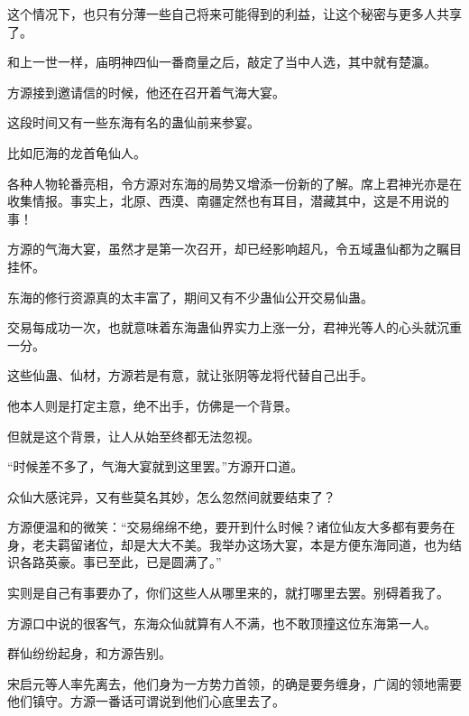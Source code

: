 \begin{this_body}
这个情况下，也只有分薄一些自己将来可能得到的利益，让这个秘密与更多人共享了。

和上一世一样，庙明神四仙一番商量之后，敲定了当中人选，其中就有楚瀛。

方源接到邀请信的时候，他还在召开着气海大宴。

这段时间又有一些东海有名的蛊仙前来参宴。

比如厄海的龙首龟仙人。

各种人物轮番亮相，令方源对东海的局势又增添一份新的了解。席上君神光亦是在收集情报。事实上，北原、西漠、南疆定然也有耳目，潜藏其中，这是不用说的事！

方源的气海大宴，虽然才是第一次召开，却已经影响超凡，令五域蛊仙都为之瞩目挂怀。

东海的修行资源真的太丰富了，期间又有不少蛊仙公开交易仙蛊。

交易每成功一次，也就意味着东海蛊仙界实力上涨一分，君神光等人的心头就沉重一分。

这些仙蛊、仙材，方源若是有意，就让张阴等龙将代替自己出手。

他本人则是打定主意，绝不出手，仿佛是一个背景。

但就是这个背景，让人从始至终都无法忽视。

“时候差不多了，气海大宴就到这里罢。”方源开口道。

众仙大感诧异，又有些莫名其妙，怎么忽然间就要结束了？

方源便温和的微笑：“交易绵绵不绝，要开到什么时候？诸位仙友大多都有要务在身，老夫羁留诸位，却是大大不美。我举办这场大宴，本是方便东海同道，也为结识各路英豪。事已至此，已是圆满了。”

实则是自己有事要办了，你们这些人从哪里来的，就打哪里去罢。别碍着我了。

方源口中说的很客气，东海众仙就算有人不满，也不敢顶撞这位东海第一人。

群仙纷纷起身，和方源告别。

宋启元等人率先离去，他们身为一方势力首领，的确是要务缠身，广阔的领地需要他们镇守。方源一番话可谓说到他们心底里去了。

\end{this_body}

